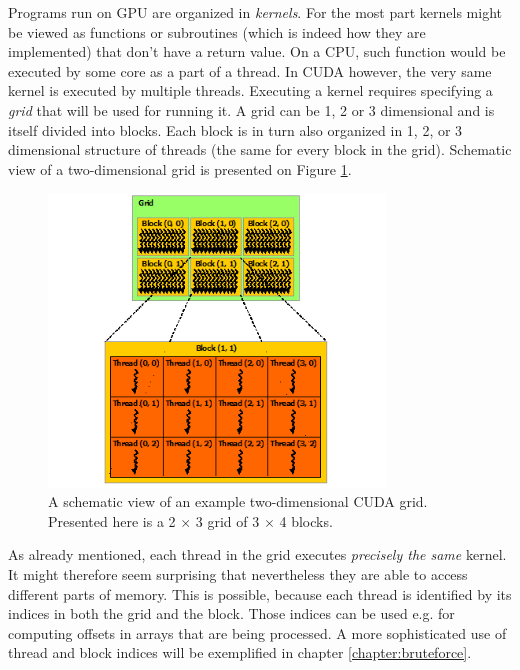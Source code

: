 Programs run on GPU are organized in \emph{kernels}. For the most part kernels might be viewed as functions or subroutines (which is indeed how they are implemented) that don't have a return value. On a CPU, such function would be executed by some core as a part of a thread. In CUDA however, the very same kernel is executed by multiple threads. Executing a kernel requires specifying a \emph{grid} that will be used for running it. A grid can be 1, 2 or 3 dimensional and is itself divided into blocks. Each block is in turn also organized in 1, 2, or 3 dimensional structure of threads (the same for every block in the grid). Schematic view of a two-dimensional grid is presented on Figure \ref{fig:cuda_grid}.

\begin{figure}[ht]
    \centering
    \includegraphics[width=0.8\textwidth]{figures/grid-of-thread-blocks.png}
    \caption{{\protect {}} A schematic view of an example two-dimensional CUDA grid. Presented here is a 2 $\times$ 3 grid of 3 $\times$ 4 blocks.}
    \label{fig:cuda_grid}
\end{figure}

As already mentioned, each thread in the grid executes \emph{precisely the same} kernel. It might therefore seem surprising that nevertheless they are able to access different parts of memory. This is possible, because each thread is identified by its indices in both the grid and the block. Those indices can be used e.g. for computing offsets in arrays that are being processed. A more sophisticated use of thread and block indices will be exemplified in chapter \ref{chapter:bruteforce}.

